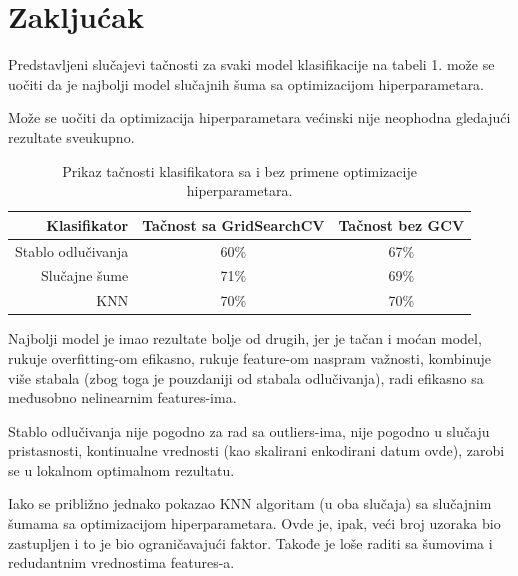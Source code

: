 \documentclass[fontsize=12bp, paper=a4]{scrarticle}
\begin{document}
\section{Zakljućak}
Predstavljeni slučajevi tačnosti za svaki model klasifikacije na tabeli 1. može se uočiti da je najbolji model slučajnih šuma sa optimizacijom hiperparametara. 

Može se uočiti da optimizacija hiperparametara većinski nije neophodna gledajući rezultate sveukupno.

\begin{table}[h]
    \centering
    \begin{tabular}{|r|c|c|}
    \hline
    \textbf{Klasifikator} & \textbf{Tačnost sa GridSearchCV} & \textbf{Tačnost bez GCV} \\
    \hline
    Stablo odlučivanja & 60\% & 67\% \\
    \hline
    Slučajne šume & 71\% & 69\% \\ 
    \hline
    KNN & 70\% & 70\% \\ 
    \hline
    \end{tabular}
    \caption{Prikaz tačnosti klasifikatora sa i bez primene optimizacije hiperparametara.} 
\end{table}

Najbolji model je imao rezultate bolje od drugih, jer je tačan i moćan model, rukuje overfitting-om efikasno, rukuje feature-om naspram važnosti, kombinuje više stabala (zbog toga je pouzdaniji od stabala odlučivanja), radi efikasno sa međusobno nelinearnim features-ima. 

Stablo odlučivanja nije pogodno za rad sa outliers-ima, nije pogodno u slučaju pristasnosti, kontinualne vrednosti (kao skalirani enkodirani datum ovde), zarobi se u lokalnom optimalnom rezultatu.

Iako se približno jednako pokazao KNN algoritam (u oba slučaja) sa slučajnim šumama sa optimizacijom hiperparametara. Ovde je, ipak, veći broj uzoraka bio zastupljen i to je bio ograničavajući faktor. Takođe je loše raditi sa šumovima i redudantnim vrednostima features-a.
\newpage

%     
    
    
\end{document}

